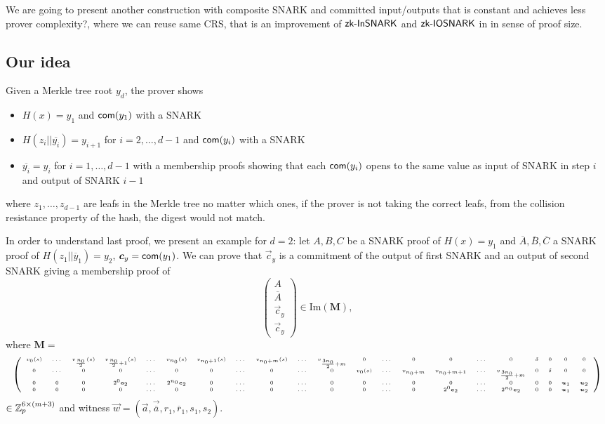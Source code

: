 We are going to present another construction with composite SNARK and committed input/outputs that is constant and \color{red} achieves less prover complexity?\color{black}, where we can reuse same CRS, that is an improvement of $\textsf{zk\mbox{-}InSNARK}$ and $\textsf{zk\mbox{-}IOSNARK}$ in \cite{C:AgrGanMoh18} in sense of proof size.

\subsection{Our idea}

Given a Merkle tree root $y_d$, the prover shows
\begin{itemize}
	\item $H(x)=y_1$ and $\mathsf{com}(y_1)$ with a SNARK 
	\item  $H(z_i || \overline{y_{i}}) = y_{i+1}$ for $i=2,\dots,d-1$ and $\mathsf{com}(y_i)$ with a SNARK
	\item $\overline{y_i} = y_i$ for $i=1,\dots,d-1$ with a membership proofs showing that each $\mathsf{com}(y_i)$ opens to the same value as input of SNARK in step $i$ and output of SNARK $i-1$
\end{itemize}
where $z_1,\dots,z_{d-1}$ are leafs in the Merkle tree no matter which ones, if the prover is not taking the correct leafs, from the collision resistance property of the hash, the digest would not match.

In order to understand last proof, we present an example for $d=2$: let $A,B,C$ be a SNARK proof of
$H(x)=y_1$  and $\overline{A},\overline{B},\overline{C}$ a SNARK proof of $H(z_1||\overline{y}_1)=y_2$, $\vec{c}_y=\com(y_1)$. We can prove that $\vec{c}_y$ is a commitment of the output of first SNARK and an output of second SNARK giving a membership proof of
$$\left(\begin{array}{c}
A\\
\overline{A}\\
\vec{c}_y\\
\vec{c}_y
\end{array}\right) \in \text{Im} \left(\mathbf{M}\right), $$
where $\mathbf{M}=$
$$\left(\tiny\begin{array}{c c c c c c c c c c c c c c c cc c c c c}
 v_0(s) & \dots &  v_{\frac{n_0}{2}}(s)&  v_{\frac{n_0}{2}+1}(s)&\dots &  v_{n_0}(s) & v_{n_0+1}(s) & \dots & v_{n_0+m}(s)& \dots& v_{\frac{3n_0}{2}+m}& 0 & \dots& 0 & 0& \dots &0 & \delta & 0 & 0 & 0 \\
 0 &  \dots &  0& 0& \dots & 0 &  0 & \dots & 0 &\dots& 0 &v_0(s) &\dots &v_{n_0+m} &v_{n_0+m+1}& \dots & v_{\frac{3n_0}{2}+m}& 0&\delta  &0 &0\\
 0 & 0 & 0 & 2^0\vec{e}_2 &  \dots &  2^{n_0} \vec{e}_2 & 0 & \dots & 0 & \dots & 0 &0 & \dots & 0&0 &\dots & 0  & 0 & 0& \vec{u}_1 & \vec{u}_2\\
 0 & 0 & 0 & 0 &  \dots &  0 & 0 & \dots & 0 & \dots & 0 & 0& \dots & 0& 2^0\vec{e}_2&\dots & 2^{n_0} \vec{e}_2  & 0 & 0& \vec{u}_1 & \vec{u}_2\\
\end{array}\right)$$ 
$\in \mathbb{Z}_p^{6\times (m+3)}$
and witness $\vec{w} = \left(\vec{a},\vec{\overline{a}},r_1,\overline{r}_1,s_1,s_2\right)$.

